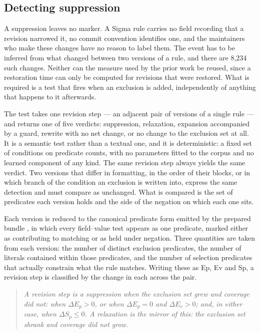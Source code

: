 \subsection{Detecting suppression}
\label{sec:detecting}

A suppression leaves no marker. A Sigma rule carries no field recording that a revision narrowed it, no commit convention identifies one, and the maintainers who make these changes have no reason to label them. The event has to be inferred from what changed between two versions of a rule, and there are 8,234 such changes. Neither can the measure used by the prior work be reused, since a restoration time can only be computed for revisions that were restored. What is required is a test that fires when an exclusion is added, independently of anything that happens to it afterwards.

The test takes one revision step --- an adjacent pair of versions of a single rule --- and returns one of five verdicts: suppression, relaxation, expansion accompanied by a guard, rewrite with no net change, or no change to the exclusion set at all. It is a semantic test rather than a textual one, and it is deterministic: a fixed set of conditions on predicate counts, with no parameters fitted to the corpus and no learned component of any kind. The same revision step always yields the same verdict. Two versions that differ in formatting, in the order of their blocks, or in which branch of the condition an exclusion is written into, express the same detection and must compare as unchanged. What is compared is the set of predicates each version holds and the side of the negation on which each one sits.

Each version is reduced to the canonical predicate form emitted by the prepared bundle \citep{long2026}, in which every field--value test appears as one predicate, marked either as contributing to matching or as held under negation. Three quantities are taken from each version: the number of distinct exclusion predicates, the number of literals contained within those predicates, and the number of selection predicates that actually constrain what the rule matches. Writing these as Ep, Ev and Sp, a revision step is classified by the change in each across the pair.

\begin{quote}\itshape
A revision step is a suppression when the exclusion set grew and coverage did not: when ${\Delta E_{p} > 0}$, or when ${\Delta E_{p} = 0}$ and ${\Delta E_{v} > 0}$; and, in either case, when ${\Delta S_{p} \leq 0}$. A relaxation is the mirror of this: the exclusion set shrank and coverage did not grow.
\end{quote}

